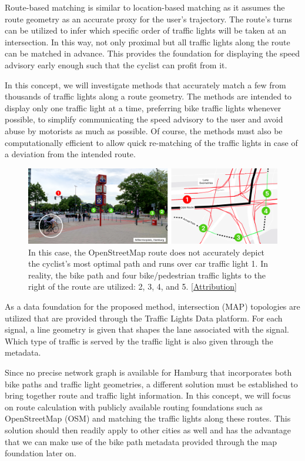 Route-based matching is similar to location-based matching as it assumes the route geometry as an accurate proxy for the user's trajectory. The route's turns can be utilized to infer which specific order of traffic lights will be taken at an intersection. In this way, not only proximal but all traffic lights along the route can be matched in advance. This provides the foundation for displaying the speed advisory early enough such that the cyclist can profit from it. 

In this concept, we will investigate methods that accurately match a few from thousands of traffic lights along a route geometry. The methods are intended to display only one traffic light at a time, preferring bike traffic lights whenever possible, to simplify communicating the speed advisory to the user and avoid abuse by motorists as much as possible. Of course, the methods must also be computationally efficient to allow quick re-matching of the traffic lights in case of a deviation from the intended route.

\begin{figure}[htbp]
\centering
\includegraphics[width=\linewidth]{images/sg-selection-example.png}
\caption{In this case, the OpenStreetMap route does not accurately depict the cyclist's most optimal path and runs over car traffic light 1. In reality, the bike path and four bike/pedestrian traffic lights to the right of the route are utilized: 2, 3, 4, and 5. [\hyperref[attribution]{Attribution}]}
\label{fig:sg-selection-example}
\end{figure}

As a data foundation for the proposed method, intersection (MAP) topologies are utilized that are provided through the Traffic Lights Data platform. For each signal, a line geometry is given that shapes the lane associated with the signal. Which type of traffic is served by the traffic light is also given through the metadata.

Since no precise network graph is available for Hamburg that incorporates both bike paths and traffic light geometries, a different solution must be established to bring together route and traffic light information. In this concept, we will focus on route calculation with publicly available routing foundations such as OpenStreetMap (OSM) and matching the traffic lights along these routes. This solution should then readily apply to other cities as well and has the advantage that we can make use of the bike path metadata provided through the map foundation later on.

